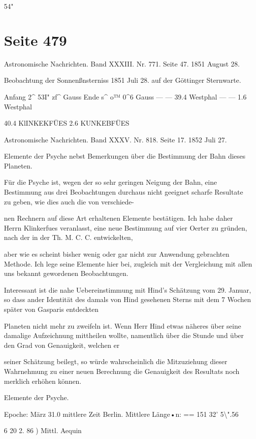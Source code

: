 \documentclass[10pt,a4paper]{article}
\begin{document}
54"


\newpage
\section*{Seite 479}
Astronomische Nachrichten. Band XXXIII. Nr. 771. Seite 47. 1851 August 28.

Beobachtung der Sonnenßnsterniss 1851 Juli 28. auf der Göttinger Sternwarte.

Anfang 2\textasciicircum{} 53I" zf\textasciicircum{} Gauss Ende s\textasciicircum{} o™ 0\textasciicircum{}6 Gauss — — 39.4 Westphal — — 1.6 Westphal

40.4 KlINKEKFÜES 2.6 KUNKEBFÜES

Astronomische Nachrichten. Band XXXV. Nr. 818. Seite 17. 1852 Juli 27.

Elemente der Psyche nebst Bemerkungen über die Bestimmung der Bahn dieses Planeten.

Für die Psyche ist, wegen der so sehr geringen Neigung der Bahn, eine Bestimmung aus drei Beobachtungen durchaus nicht geeignet scharfe Resultate zu geben, wie dies auch die von verschiede-

nen Rechnern auf diese Art erhaltenen Elemente bestätigen. Ich habe daher Herrn Klinkerfues veranlasst, eine neue Bestimmung auf vier Oerter zu gründen, nach der in der Th. M. C. C. entwickelten,

aber wie es scheint bisher wenig oder gar nicht zur Anwendung gebrachten Methode. Ich lege seine Elemente hier bei, zugleich mit der Vergleichung mit allen uns bekannt gewordenen Beobachtungen.

Interessant ist die nahe Uebereinstimmung mit Hind's Schätzung vom 29. Januar, so dass ander Identität des damals von Hind gesehenen Sterns mit dem 7 Wochen später von Gasparis entdeckten

Planeten nicht mehr zu zweifeln ist. Wenn Herr Hind etwas näheres über seine damalige Aufzeichnung mittheilen wollte, namentlich über die Stunde und über den Grad von Genauigkeit, welchen er

seiner Schätzung beilegt, so würde wahrscheinlich die Mitzuziehung dieser Wahrnehmung zu einer neuen Berechnung die Genauigkeit des Resultats noch merklich erhöhen können.

Elemente der Psyche.

Epoche: März 31.0 mittlere Zeit Berlin. Mittlere Länge•n: == 151\textdegree{} 32' 5\textbackslash{}".56

6 20 2. 86 ) Mittl. Aequin
\end{document}
